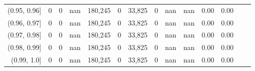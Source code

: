 \begin{tabular}{rrrrrrrrrrrrrr}
(0.95, 0.96]   &        0 &       0 &    nan &  180,245 &        0 &  33,825 &       0 &   nan &   nan &  0.00 &      0.00 \\
(0.96, 0.97]   &        0 &       0 &    nan &  180,245 &        0 &  33,825 &       0 &   nan &   nan &  0.00 &      0.00 \\
(0.97, 0.98]   &        0 &       0 &    nan &  180,245 &        0 &  33,825 &       0 &   nan &   nan &  0.00 &      0.00 \\
(0.98, 0.99]   &        0 &       0 &    nan &  180,245 &        0 &  33,825 &       0 &   nan &   nan &  0.00 &      0.00 \\
(0.99, 1.0]    &        0 &       0 &    nan &  180,245 &        0 &  33,825 &       0 &   nan &   nan &  0.00 &      0.00 \\
\bottomrule
\end{tabular}
